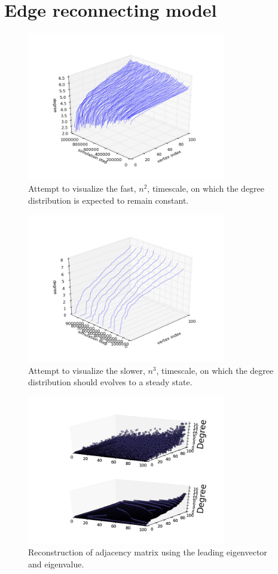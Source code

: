 \documentclass[11pt]{article}
\begin{document}
\section*{Edge reconnecting model}

\begin{figure}
  \centering
  \includegraphics[height=65mm]{erQuadraticTimescale}
  \caption{Attempt to visualize the fast, $n^{2}$, timescale, on which the degree distribution is expected to remain constant.}
  \label{fig:erFast}
\end{figure}

\begin{figure}
  \centering
  \includegraphics[height=65mm]{erCubicTimescale}
  \caption{Attempt to visualize the slower, $n^{3}$, timescale, on which the degree distribution should evolves to a steady state.}
  \label{fig:erSlow}
\end{figure}

\begin{figure}
  \centering
  \includegraphics[height=65mm]{erRecon}
  \caption{Reconstruction of adjacency matrix using the leading eigenvector and eigenvalue.}
  \label{fig:erRecon}
\end{figure}
\end{document}
